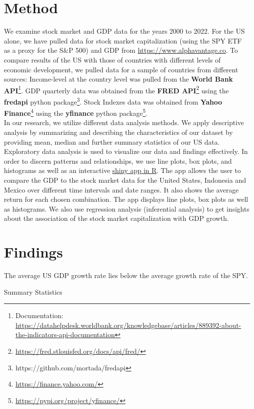 \documentclass[12pt,a4paper,english]{article}
\begin{document}
\section{Method}
We examine stock market and GDP data for the years 2000 to 2022. For the US alone, we have pulled data for stock market capitalization (using the SPY ETF as a proxy for the S\&P 500) and GDP from \url{https://www.alphavantage.co}. To compare results of the US with those of countries with different levels of economic development, we pulled data for a sample of countries from different sources:
Income-level at the country level was pulled from the \textbf{World Bank API}\footnote{Documentation: \url{https://datahelpdesk.worldbank.org/knowledgebase/articles/889392-about-the-indicators-api-documentation}}.
GDP quarterly data was obtained from the \textbf{FRED API}\footnote{\url{https://fred.stlouisfed.org/docs/api/fred/}}
    using the \textbf{fredapi} python package\footnote{https://github.com/mortada/fredapi}.
Stock Indexes data was obtained from \textbf{Yahoo Finance}\footnote{\url{https://finance.yahoo.com/}} using the
    \textbf{yfinance} python package\footnote{\url{https://pypi.org/project/yfinance/}}.\\
    

In our research, we utilize different data analysis methods. 
We apply descriptive analysis by summarizing and describing the characteristics of our dataset by providing mean, median and further summary statistics of our US data. 
Exploratory data analysis is used to visualize our data and findings effectively. In order to discern patterns and relationships, we use line plots, box plots, and histograms as well as an interactive  \href{https://flurinaschneider.shinyapps.io/DTFF22/}{shiny app in R}. The app allows the user to compare the GDP to the stock market data for the United States, Indonesia and Mexico over different time intervals and date ranges. It also shows the average return for each chosen combination. The app displays line plots, box plots as well as histograms.  
We also use regression analysis (inferential analysis) to get insights about the association of the stock market capitalization with GDP growth. 

\section{Findings}
The average US GDP growth rate lies below the average growth rate of the SPY. 
\begin{table}[H]
    \centering
	
	\caption{Summary Statistics}
    \label{summary_stats_us}
\end{table}
\end{document}
